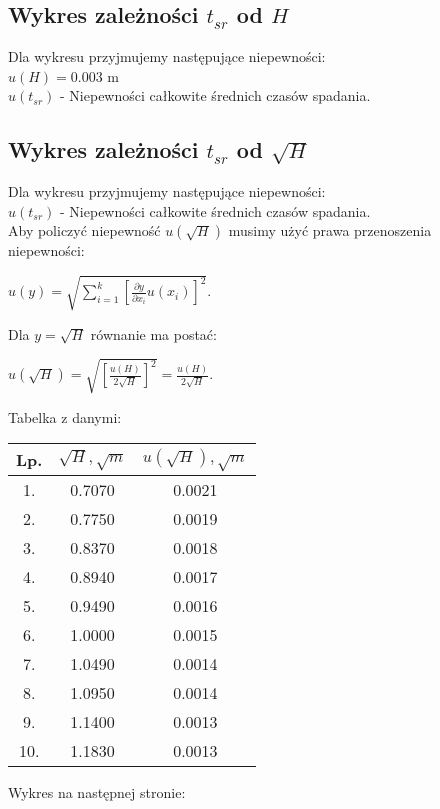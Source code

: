 \documentclass[12pt]{article}
\begin{document}
\subsection*{Wykres zależności $t_{sr}$ od $H$}

Dla wykresu przyjmujemy następujące niepewności: \\
$u(H) = 0.003$ m \\
$u(t_{sr})$ - Niepewności całkowite średnich czasów spadania.


\subsection*{Wykres zależności $t_{sr}$ od $\sqrt{H}$}

Dla wykresu przyjmujemy następujące niepewności: \\
$u(t_{sr})$ - Niepewności całkowite średnich czasów spadania. \\
Aby policzyć niepewność $u(\sqrt{H})$ musimy użyć prawa przenoszenia
niepewności:
\begin{center}
    $u(y)=\sqrt{\sum_{i=1}^{k}[\frac{\partial y}{\partial x_i}u(x_i)]^2}$.
\end{center}
Dla $y = \sqrt{H}$ równanie ma postać:
\begin{center}
    $u(\sqrt{H}) = \sqrt{[\frac{u(H)}{2\sqrt{H}}]^2} = \frac{u(H)}{2\sqrt{H}}$.
\end{center}
Tabelka z danymi:
\begin{center}
    \begin{tabular} { | c | c | c | }
        \hline
        Lp. & $\sqrt{H}, \sqrt{m}$ & $u(\sqrt{H}), \sqrt{m}$ \\
        \hline
        1.  & 0.7070               & 0.0021                  \\ \hline
        2.  & 0.7750               & 0.0019                  \\ \hline
        3.  & 0.8370               & 0.0018                  \\ \hline
        4.  & 0.8940               & 0.0017                  \\ \hline
        5.  & 0.9490               & 0.0016                  \\ \hline
        6.  & 1.0000              & 0.0015                  \\ \hline
        7.  & 1.0490               & 0.0014                  \\ \hline
        8.  & 1.0950               & 0.0014                  \\ \hline
        9.  & 1.1400               & 0.0013                  \\ \hline
        10. & 1.1830               & 0.0013                  \\ \hline
    \end{tabular}
\end{center}
Wykres na następnej stronie:
\end{document}
